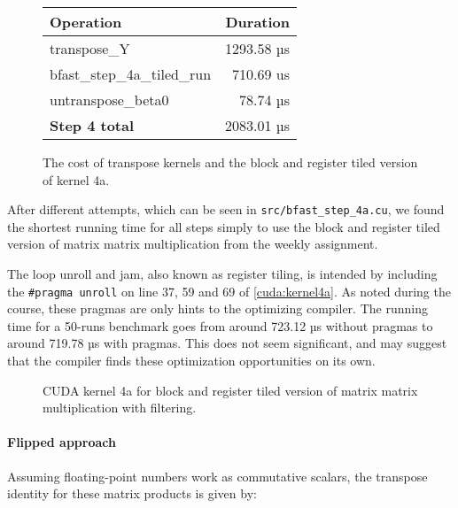 \begin{figure}[H]
    \centering
    \begin{tabular}{l r}
        \textbf{Operation} & \textbf{Duration} \\ \hline
        transpose\_Y                & 1293.58 µs \\
        bfast\_step\_4a\_tiled\_run & 710.69 us \\
        untranspose\_beta0          & 78.74 µs \\
        \textbf{Step 4 total}              &  2083.01 µs
    \end{tabular}
    \caption{The cost of transpose kernels and the block and register tiled
    version of kernel 4a.}
        \label{tbl:transposecost}
\end{figure}

After different attempts, which can be seen in \texttt{src/bfast\_step\_4a.cu},
we found the shortest running time for all steps simply to use the block and
register tiled version of matrix matrix multiplication from the weekly
assignment. 

The loop unroll and jam, also known as register tiling, is intended by including
the \texttt{\#pragma unroll} on line 37, 59 and 69 of \autoref{cuda:kernel4a}.
As noted during the course, these pragmas are only hints to the optimizing
compiler. The running time for a 50-runs benchmark goes from around 723.12 µs
without pragmas to around 719.78 µs with pragmas. This does not seem
significant, and may suggest that the compiler finds these optimization
opportunities on its own.



\begin{figure}[H]
    \centering
    \caption{CUDA kernel 4a for block and register tiled version of matrix matrix
    multiplication with filtering.}
    \label{cuda:kernel4a}
\end{figure}



\paragraph{Flipped approach}
Assuming floating-point numbers work as commutative scalars, the transpose
identity for these matrix products is given by:

